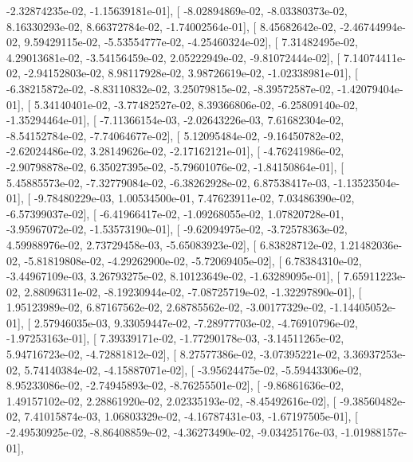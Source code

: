 \documentclass{article}
\begin{document}
         -2.32874235e-02,  -1.15639181e-01],
       [ -8.02894869e-02,  -8.03380373e-02,   8.16330293e-02,
          8.66372784e-02,  -1.74002564e-01],
       [  8.45682642e-02,  -2.46744994e-02,   9.59429115e-02,
         -5.53554777e-02,  -4.25460324e-02],
       [  7.31482495e-02,   4.29013681e-02,  -3.54156459e-02,
          2.05222949e-02,  -9.81072444e-02],
       [  7.14074411e-02,  -2.94152803e-02,   8.98117928e-02,
          3.98726619e-02,  -1.02338981e-01],
       [ -6.38215872e-02,  -8.83110832e-02,   3.25079815e-02,
         -8.39572587e-02,  -1.42079404e-01],
       [  5.34140401e-02,  -3.77482527e-02,   8.39366806e-02,
         -6.25809140e-02,  -1.35294464e-01],
       [ -7.11366154e-03,  -2.02643226e-03,   7.61682304e-02,
         -8.54152784e-02,  -7.74064677e-02],
       [  5.12095484e-02,  -9.16450782e-02,  -2.62024486e-02,
          3.28149626e-02,  -2.17162121e-01],
       [ -4.76241986e-02,  -2.90798878e-02,   6.35027395e-02,
         -5.79601076e-02,  -1.84150864e-01],
       [  5.45885573e-02,  -7.32779084e-02,  -6.38262928e-02,
          6.87538417e-03,  -1.13523504e-01],
       [ -9.78480229e-03,   1.00534500e-01,   7.47623911e-02,
          7.03486390e-02,  -6.57399037e-02],
       [ -6.41966417e-02,  -1.09268055e-02,   1.07820728e-01,
         -3.95967072e-02,  -1.53573190e-01],
       [ -9.62094975e-02,  -3.72578363e-02,   4.59988976e-02,
          2.73729458e-03,  -5.65083923e-02],
       [  6.83828712e-02,   1.21482036e-02,  -5.81819808e-02,
         -4.29262900e-02,  -5.72069405e-02],
       [  6.78384310e-02,  -3.44967109e-03,   3.26793275e-02,
          8.10123649e-02,  -1.63289095e-01],
       [  7.65911223e-02,   2.88096311e-02,  -8.19230944e-02,
         -7.08725719e-02,  -1.32297890e-01],
       [  1.95123989e-02,   6.87167562e-02,   2.68785562e-02,
         -3.00177329e-02,  -1.14405052e-01],
       [  2.57946035e-03,   9.33059447e-02,  -7.28977703e-02,
         -4.76910796e-02,  -1.97253163e-01],
       [  7.39339171e-02,  -1.77290178e-03,  -3.14511265e-02,
          5.94716723e-02,  -4.72881812e-02],
       [  8.27577386e-02,  -3.07395221e-02,   3.36937253e-02,
          5.74140384e-02,  -4.15887071e-02],
       [ -3.95624475e-02,  -5.59443306e-02,   8.95233086e-02,
         -2.74945893e-02,  -8.76255501e-02],
       [ -9.86861636e-02,   1.49157102e-02,   2.28861920e-02,
          2.02335193e-02,  -8.45492616e-02],
       [ -9.38560482e-02,   7.41015874e-03,   1.06803329e-02,
         -4.16787431e-03,  -1.67197505e-01],
       [ -2.49530925e-02,  -8.86408859e-02,  -4.36273490e-02,
         -9.03425176e-03,  -1.01988157e-01],
\end{document}
